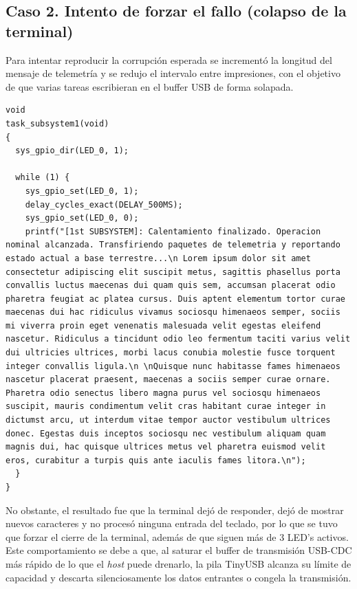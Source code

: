 \documentclass[12pt,letterpaper]{article}
\begin{document}
\subsection*{Caso 2. Intento de forzar el fallo (colapso de la terminal)}
Para intentar reproducir la corrupción esperada se incrementó la longitud del mensaje de telemetría y se redujo el intervalo entre impresiones, con el objetivo de que varias tareas escribieran en el buffer USB de forma solapada.\\

\begin{lstlisting}[style=modernc]
void
task_subsystem1(void)
{
  sys_gpio_dir(LED_0, 1);

  while (1) {
    sys_gpio_set(LED_0, 1);
    delay_cycles_exact(DELAY_500MS);
    sys_gpio_set(LED_0, 0);
    printf("[1st SUBSYSTEM]: Calentamiento finalizado. Operacion nominal alcanzada. Transfiriendo paquetes de telemetria y reportando estado actual a base terrestre...\n Lorem ipsum dolor sit amet consectetur adipiscing elit suscipit metus, sagittis phasellus porta convallis luctus maecenas dui quam quis sem, accumsan placerat odio pharetra feugiat ac platea cursus. Duis aptent elementum tortor curae maecenas dui hac ridiculus vivamus sociosqu himenaeos semper, sociis mi viverra proin eget venenatis malesuada velit egestas eleifend nascetur. Ridiculus a tincidunt odio leo fermentum taciti varius velit dui ultricies ultrices, morbi lacus conubia molestie fusce torquent integer convallis ligula.\n \nQuisque nunc habitasse fames himenaeos nascetur placerat praesent, maecenas a sociis semper curae ornare. Pharetra odio senectus libero magna purus vel sociosqu himenaeos suscipit, mauris condimentum velit cras habitant curae integer in dictumst arcu, ut interdum vitae tempor auctor vestibulum ultrices donec. Egestas duis inceptos sociosqu nec vestibulum aliquam quam magnis dui, hac quisque ultrices metus vel pharetra euismod velit eros, curabitur a turpis quis ante iaculis fames litora.\n");
  }
}
\end{lstlisting}

\bigskip
  
\noindent
No obstante, el resultado fue que la terminal dejó de responder, dejó de mostrar nuevos caracteres y no procesó ninguna entrada del teclado, por lo que se tuvo que forzar el cierre de la terminal, además de que siguen más de 3 LED's activos. Este comportamiento se debe a que, al saturar el buffer de transmisión USB-CDC más rápido de lo que el \textit{host} puede drenarlo, la pila TinyUSB alcanza su límite de capacidad y descarta silenciosamente los datos entrantes o congela la transmisión.\\
  
\end{document}

